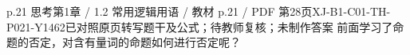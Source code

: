 \par\noindent\begin{minipage}{\linewidth}
\begin{bankitem}{p.21 思考}{第1章 / 1.2 常用逻辑用语 / 教材 p.21 / PDF 第28页}{XJ-B1-C01-TH-P021-Y1462}{已对照原页转写题干及公式；待教师复核；未制作答案}
前面学习了命题的否定，对含有量词的命题如何进行否定呢？
\end{bankitem}
\end{minipage}\par\medskip
